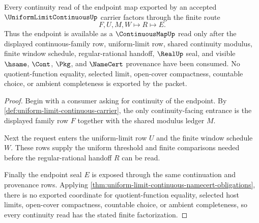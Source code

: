 \begin{theorem}
\label{thm:uniform-limit-continuous-continuity-handoff}
Every continuity read of the endpoint map exported by an accepted $\UniformLimitContinuousUp$ carrier factors through the finite route
$$
F,U,M,W \longmapsto R \longmapsto E.
$$
Thus the endpoint is available as a $\ContinuousMapUp$ read only after the displayed continuous-family row, uniform-limit row, shared continuity modulus, finite window schedule, regular-rational handoff, $\RealUp$ seal, and visible $\hsame$, $\Cont$, $\Pkg$, and $\NameCert$ provenance have been consumed. No quotient-function equality, selected limit, open-cover compactness, countable choice, or ambient completeness is exported by the packet.
\end{theorem}
\begin{proof}
Begin with a consumer asking for continuity of the endpoint. By \autoref{def:uniform-limit-continuous-carrier}, the only continuity-facing entrance is the displayed family row $F$ together with the shared modulus ledger $M$.

Next the request enters the uniform-limit row $U$ and the finite window schedule $W$. These rows supply the uniform threshold and finite comparisons needed before the regular-rational handoff $R$ can be read.

Finally the endpoint seal $E$ is exposed through the same continuation and provenance rows. Applying \autoref{thm:uniform-limit-continuous-namecert-obligations}, there is no exported coordinate for quotient-function equality, selected host limits, open-cover compactness, countable choice, or ambient completeness, so every continuity read has the stated finite factorization.
\end{proof}

